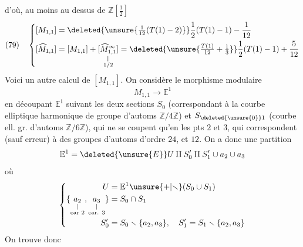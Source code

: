 d'où, au moins au dessus de $\mathbb Z[\frac12]$
\[
(79)\quad\left\{\begin{aligned}
[M_{1,1}]&=\deleted{\unsure{\tfrac1{12}(T(1)-2)}}\frac12(T(1)-1)-\frac1{12}\\
[\widehat M_{1,1}]&=[M_{1,1}]+\underset{\substack{\Vert\\1/2}}{[\widehat M^\infty_{1,1}]}=\deleted{\unsure{\tfrac{T(1)}{12}+\tfrac13}}\frac12(T(1)-1)+\frac5{12}
\end{aligned}\right.
\]
Voici un autre calcul de $[M_{1,1}]$. On considère le morphisme modulaire
\[
M_{1,1}\longrightarrow\mathbb E^1
\]
 en découpant $\mathbb E^1$ suivant les deux sections $S_0$ (correspondant à la courbe elliptique harmonique de groupe d'automs $\mathbb Z/4\mathbb Z$) et $S_{\deleted{\unsure{0}}1}$  (courbe ell.   gr. d'automs $\mathbb Z/6\mathbb Z$), qui ne se coupent qu'en les pts $2$ et $3$, qui correspondent (sauf erreur) à des groupes d'automs d'ordre $24$, et $12$. On a donc une partition
\[
\mathbb E^1=\deleted{\unsure{E}}U\amalg S'_0\amalg S'_1\cup a_2\cup a_3
\]
où 
\[
\left\{\begin{aligned}
U&=\mathbb E^1\unsure{+|\smallsetminus}(S_0\cup S_1)\\
\{\underset{\substack{|\\\text{car }2}}{a_2},\underset{\substack{|\\\text{car. }3}}{a_3}\}&=S_0\cap S_1\\
S'_0&=S_0\smallsetminus\{a_2,a_3\},\quad S'_1=S_1\smallsetminus\{a_2,a_3\}
\end{aligned}\right.
\]
On trouve donc

